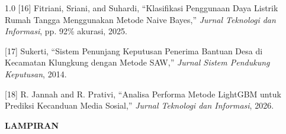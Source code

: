 \documentclass[12pt, a4paper, onecolumn, oneside]{report}
\begin{document}
\begin{spacing}{1.0}
\vspace{0.3cm}
\noindent\hangindent=1.5cm
{[16]} Fitriani, Sriani, and Suhardi, ``Klasifikasi Penggunaan Daya Listrik Rumah Tangga Menggunakan Metode Naive Bayes,'' \textit{Jurnal Teknologi dan Informasi}, pp. 92\% akurasi, 2025.

\vspace{0.3cm}
\noindent\hangindent=1.5cm
{[17]} Sukerti, ``Sistem Penunjang Keputusan Penerima Bantuan Desa di Kecamatan Klungkung dengan Metode SAW,'' \textit{Jurnal Sistem Pendukung Keputusan}, 2014.

\vspace{0.3cm}
\noindent\hangindent=1.5cm
{[18]} R. Jannah and R. Prativi, ``Analisa Performa Metode LightGBM untuk Prediksi Kecanduan Media Sosial,'' \textit{Jurnal Teknologi dan Informasi}, 2026.

\end{spacing}

\newpage
\thispagestyle{empty}
{}
\vspace*{\fill}
\begin{center}
{\fontsize{14pt}{16pt}\selectfont\bfseries LAMPIRAN}
\end{center}
\vspace*{\fill}
\end{document}
